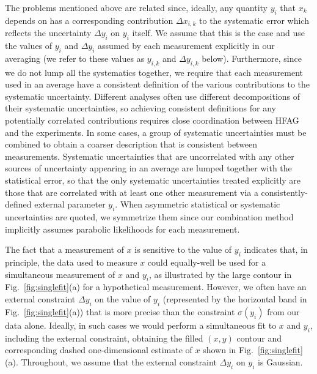 The problems mentioned above are related since, ideally, any quantity $y_i$
that $x_k$ depends on has a corresponding contribution $\Delta x_{i,k}$ to the
systematic error which reflects the uncertainty $\Delta y_i$ on $y_i$
itself. We assume that this is the case and use the values of $y_i$ and
$\Delta y_i$ assumed by each measurement explicitly in our
averaging (we refer to these values as $y_{i,k}$ and $\Delta y_{i,k}$
below). Furthermore, since we do not lump all the systematics
together,
we require that each measurement used in an average have a consistent
definition of the various contributions to the systematic uncertainty.
Different analyses often use different decompositions of their systematic
uncertainties, so achieving consistent definitions for any potentially
correlated contributions requires close coordination between HFAG and
the experiments. In some cases, a group of
systematic uncertainties must be combined to obtain a coarser
description that is consistent between measurements. Systematic uncertainties
that are uncorrelated with any other sources of uncertainty appearing
in an average are lumped together with the statistical error, so that the only
systematic uncertainties treated explicitly are those that are
correlated with at least one other measurement via a consistently-defined
external parameter $y_i$. When asymmetric statistical or systematic
uncertainties are quoted, we symmetrize them since our combination
method implicitly assumes parabolic likelihoods for each measurement.

The fact that a measurement of $x$ is sensitive to the value of $y_i$
indicates that, in principle, the data used to measure $x$ could
equally-well be used for a simultaneous measurement of $x$ and $y_i$, as
illustrated by the large contour in Fig.~\ref{fig:singlefit}(a) for a hypothetical
measurement. However, we often have an external constraint $\Delta
y_i$ on the value of $y_i$ (represented by the horizontal band in
Fig.~\ref{fig:singlefit}(a)) that is more precise than the constraint
$\sigma(y_i)$ from
our data alone. Ideally, in such cases we would perform a simultaneous
fit to $x$ and $y_i$, including the external constraint, obtaining the
filled $(x,y)$ contour and corresponding dashed one-dimensional estimate of
$x$ shown in Fig.~\ref{fig:singlefit}(a). Throughout, we assume that
the external constraint $\Delta y_i$ on $y_i$ is Gaussian.

